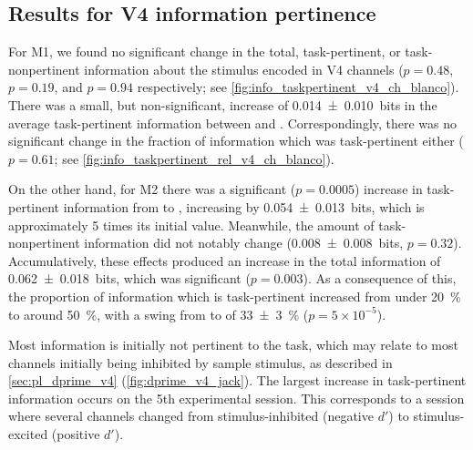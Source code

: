 \subsection{Results for \acs{V4} information pertinence}

For \ac{M1}, we found no significant change in the total, task-pertinent, or task-nonpertinent information about the stimulus encoded in \ac{V4} channels ($p=0.48$, $p=0.19$, and $p=0.94$ respectively; see \autoref{fig:info_taskpertinent_v4_ch_blanco}).
There was a small, but non-significant, increase of \SI{+0.014\pm0.010}{bits} in the average task-pertinent information between  and .
Correspondingly, there was no significant change in the fraction of information which was task-pertinent either ($p=0.61$; see \autoref{fig:info_taskpertinent_rel_v4_ch_blanco}).

On the other hand, for \ac{M2} there was a significant ($p=0.0005$) increase in task-pertinent information from  to , increasing by \SI{+0.054\pm0.013}{bits}, which is approximately \num{5} times its initial value.
Meanwhile, the amount of task-nonpertinent information did not notably change (\SI{+0.008\pm0.008}{bits}, $p=0.32$).
Accumulatively, these effects produced an increase in the total information of \SI{+0.062\pm0.018}{bits}, which was significant ($p=0.003$).
As a consequence of this, the proportion of information which is task-pertinent increased from under \SI{20}{\percent} to around \SI{50}{\percent}, with a swing from  to  of \SI{+33\pm3}{\percent} ($p=5 \times 10^{-5}$).

Most information is initially not pertinent to the task, which may relate to most channels initially being inhibited by sample stimulus, as described in \autoref{sec:pl_dprime_v4} (\autoref{fig:dprime_v4_jack}).
The largest increase in task-pertinent information occurs on the 5th experimental session.
This corresponds to a session where several channels changed from stimulus-inhibited (negative $d'$) to stimulus-excited (positive $d'$).

